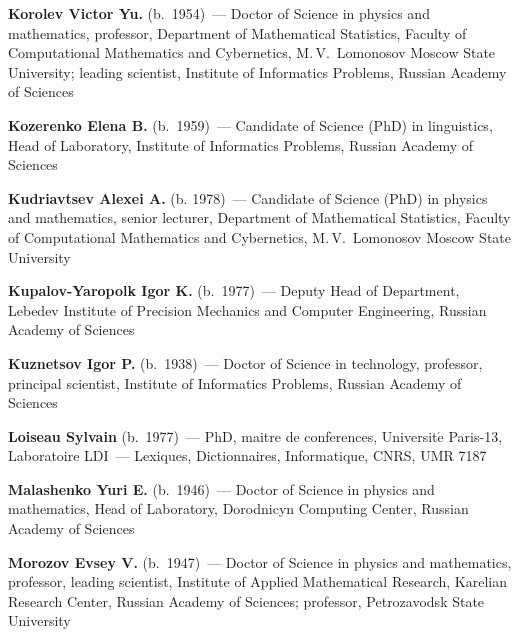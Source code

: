 \begin{multicols}{2}
\noindent
\textbf{Korolev Victor Yu.} (b.\ 1954)~--- Doctor of Science in physics and mathematics, 
professor, Department of Mathematical Statistics, Faculty of Computational Mathematics and 
Cybernetics, M.\,V.~Lomonosov Moscow State University; leading scientist, 
Institute of Informatics Problems, Russian Academy of Sciences 

\vspace*{4pt}

\noindent
\textbf{Kozerenko Elena B.} (b.\ 1959)~--- Candidate of Science (PhD) in linguistics, 
Head of Laboratory, Institute of Informatics Problems, Russian Academy of Sciences

\vspace*{4pt}

\noindent
\textbf{Kudriavtsev Alexei A.} (b. 1978)~--- Candidate of Science (PhD) in physics and mathematics, 
senior lecturer, Department of Mathematical Statistics, Faculty of Computational Mathematics 
and Cybernetics, M.\,V.~Lomonosov Moscow State University 

\vspace*{4pt}

\noindent
\textbf{Kupalov-Yaropolk Igor K.} (b.\ 1977)~--- Deputy Head of Department, 
Lebedev Institute of Precision Mechanics and Computer Engineering, Russian Academy of Sciences

\vspace*{4pt}

\noindent
\textbf{Kuznetsov Igor P.} (b.\ 1938)~--- Doctor of Science in technology, professor, principal 
scientist, Institute of Informatics Problems, Russian Academy of Sciences


\columnbreak

\noindent
\textbf{Loiseau Sylvain} (b.\ 1977)~--- PhD, maitre de conf$\acute{\mbox{e}}$rences, Universit$\acute{\mbox{e}}$ 
Paris-13, 
Laboratoire LDI~--- Lexiques, Dictionnaires, Informatique, CNRS, UMR 7187

\vspace*{4pt}

\noindent
\textbf{Malashenko Yuri E.} (b.\ 1946)~--- Doctor  of Science in physics and mathematics, 
Head of Laboratory, Dorodnicyn Computing Center, Russian Academy of Sciences

\vspace*{4pt}

\noindent
\textbf{Morozov Evsey V.} (b.\ 1947)~--- Doctor of Science in physics and mathematics, 
professor, leading scientist, Institute of Applied Mathematical Research, Karelian Research Center, 
Russian Academy of Sciences; professor, Petrozavodsk State University


\end{multicols}
